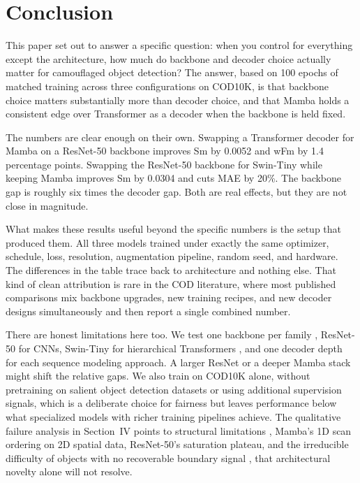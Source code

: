 \documentclass[10pt,conference]{IEEEtran}
\begin{document}
\section{Conclusion}
\label{con}

This paper set out to answer a specific question: when you control for everything except the architecture, how much do backbone and decoder choice actually matter for camouflaged object detection? The answer, based on 100 epochs of matched training across three configurations on COD10K, is that backbone choice matters substantially more than decoder choice, and that Mamba holds a consistent edge over Transformer as a decoder when the backbone is held fixed.

The numbers are clear enough on their own. Swapping a Transformer decoder for Mamba on a ResNet-50 backbone improves Sm by 0.0052 and wFm by 1.4 percentage points. Swapping the ResNet-50 backbone for Swin-Tiny while keeping Mamba improves Sm by 0.0304 and cuts MAE by 20\%. The backbone gap is roughly six times the decoder gap. Both are real effects, but they are not close in magnitude.

What makes these results useful beyond the specific numbers is the setup that produced them. All three models trained under exactly the same optimizer, schedule, loss, resolution, augmentation pipeline, random seed, and hardware. The differences in the table trace back to architecture and nothing else. That kind of clean attribution is rare in the COD literature, where most published comparisons mix backbone upgrades, new training recipes, and new decoder designs simultaneously and then report a single combined number.

There are honest limitations here too. We test one backbone per family , ResNet-50 for CNNs, Swin-Tiny for hierarchical Transformers , and one decoder depth for each sequence modeling approach. A larger ResNet or a deeper Mamba stack might shift the relative gaps. We also train on COD10K alone, without pretraining on salient object detection datasets or using additional supervision signals, which is a deliberate choice for fairness but leaves performance below what specialized models with richer training pipelines achieve. The qualitative failure analysis in Section~IV points to structural limitations , Mamba's 1D scan ordering on 2D spatial data, ResNet-50's saturation plateau, and the irreducible difficulty of objects with no recoverable boundary signal , that architectural novelty alone will not resolve.
\end{document}

